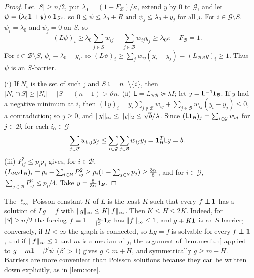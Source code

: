 \begin{proof}
Let $|S|\ge n/2$, put $\lambda_0=(1+F_{\mathcal B})/\kappa$, extend $y$ by $0$ to
$\mathcal G$, and let $\psi=(\lambda_0\mathbf 1+y)\circ\mathbf 1_{S^c}$, so
$0\le\psi\le\lambda_0+R$ and $\psi_j\le\lambda_0+y_j$ for all $j$. For
$i\in\mathcal G\setminus S$, $\psi_i=\lambda_0$ and $\psi_j=0$ on $S$, so
\[
 (L\psi)_i\ge\lambda_0\sum_{j\in S}w_{ij}-\sum_{j\in\mathcal B}w_{ij}y_j\ge
 \lambda_0\kappa-F_{\mathcal B}=1 .
\]
For $i\in\mathcal B\setminus S$, $\psi_i=\lambda_0+y_i$, so
$(L\psi)_i\ge\sum_jw_{ij}(y_i-y_j)=(L_{\mathcal B\mathcal B}y)_i\ge1$. Thus $\psi$
is an $S$-barrier.

(i) If $N_i$ is the set of such $j$ and $S\subseteq[n]\setminus\{i\}$, then
$|N_i\cap S|\ge|N_i|+|S|-(n-1)>\vartheta n$.
(ii) $\mathsf L=L_{\mathcal B\mathcal B}\succeq\lambda I$; let $y=\mathsf L^{-1}\mathbf 1_{\mathcal B}$. If
$y$ had a negative minimum at $i$, then $(\mathsf Ly)_i=y_i\sum_{j\notin\mathcal
B}w_{ij}+\sum_{j\in\mathcal B}w_{ij}(y_i-y_j)\le0$, a contradiction; so $y\ge0$,
and $\lVert y\rVert_\infty\le\lVert y\rVert_2\le\sqrt b/\lambda$. Since
$(\mathsf L\mathbf 1_{\mathcal B})_j=\sum_{i\in\mathcal G}w_{ij}$ for $j\in\mathcal B$, for each
$i_0\in\mathcal G$
\[
 \sum_{j\in\mathcal B}w_{i_0j}y_j\le\sum_{i\in\mathcal G}\sum_{j\in\mathcal B}w_{ij}y_j
 =\mathbf 1_{\mathcal B}^T\mathsf Ly=b .
\]
(iii) $P_{ij}^2\le p_ip_j$ gives, for $i\in\mathcal B$,
$(L_{\mathcal B\mathcal B}\mathbf 1_{\mathcal B})_i=p_i-\sum_{j\in\mathcal B}P_{ij}^2\ge
p_i(1-\sum_{j\in\mathcal B}p_j)\ge\frac{3\alpha}8$, and for $i\in\mathcal G$,
$\sum_{j\in\mathcal B}P_{ij}^2\le p_i/4$. Take $y=\frac8{3\alpha}\mathbf 1_{\mathcal B}$.
\end{proof}

\begin{remark}\label{rem:poisson}
The $\ell_\infty$ Poisson constant $K$ of $L$ is the least $K$ such that every
$f\perp\mathbf 1$ has a solution of $Lg=f$ with $\lVert g\rVert_\infty\le K\lVert f\rVert_\infty$. Then $K\le H\le2K$. Indeed, for
$|S|\ge n/2$ the forcing $f=\mathbf 1-\frac n{|S|}\mathbf 1_S$ has $\lVert f\rVert_\infty\le1$,
and $g+K\mathbf 1$ is an $S$-barrier; conversely, if $H<\infty$ the graph is connected,
so $Lg=f$ is solvable for every $f\perp\mathbf 1$, and if $\lVert f\rVert_\infty\le1$ and $m$ is
a median of $g$, the argument of \cref{lem:median}
applied to $g-m\mathbf 1-\beta'\psi$ ($\beta'>1$) gives $g\le m+H$, and symmetrically
$g\ge m-H$. Barriers are more convenient than Poisson solutions because they
can be written down explicitly, as in \cref{lem:core}.
\end{remark}


